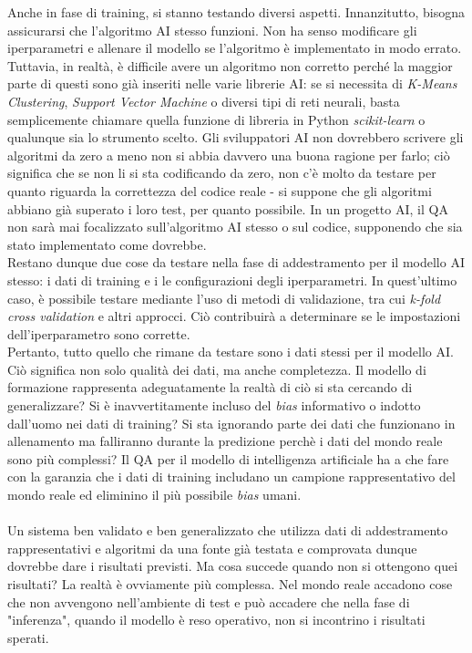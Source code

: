 \documentclass[a4paper,12pt]{report}
\begin{document}
Anche in fase di training, si stanno testando diversi aspetti. Innanzitutto, bisogna assicurarsi che l'algoritmo AI stesso funzioni. Non ha senso modificare gli iperparametri e allenare il modello se l'algoritmo è implementato in modo errato. Tuttavia, in realtà, è difficile avere un algoritmo non corretto perché la maggior parte di questi sono già inseriti nelle varie librerie AI: se si necessita di \textit{K-Means Clustering}, \textit{Support Vector Machine} o diversi tipi di reti neurali, basta semplicemente chiamare quella funzione di libreria in Python \textit{scikit-learn} o qualunque sia lo strumento scelto. Gli sviluppatori AI non dovrebbero scrivere gli algoritmi da zero a meno non si abbia davvero una buona ragione per farlo; ciò significa che se non li si sta codificando da zero, non c'è molto da testare per quanto riguarda la correttezza del codice reale - si suppone che gli algoritmi abbiano già superato i loro test, per quanto possibile. In un progetto AI, il QA non sarà mai focalizzato sull'algoritmo AI stesso o sul codice, supponendo che sia stato implementato come dovrebbe.\\
Restano dunque due cose da testare nella fase di addestramento per il modello AI stesso: i dati di training e i le configurazioni degli iperparametri. In quest'ultimo caso, è possibile testare mediante l'uso di metodi di validazione, tra cui \textit{k-fold cross validation} e altri approcci. Ciò contribuirà a determinare se le impostazioni dell'iperparametro sono corrette.\\
Pertanto, tutto quello che rimane da testare sono i dati stessi per il modello AI. Ciò significa non solo qualità dei dati, ma anche completezza. Il modello di formazione rappresenta adeguatamente la realtà di ciò si sta cercando di generalizzare? Si è inavvertitamente incluso del \textit{bias} informativo o indotto dall'uomo nei dati di training? Si sta ignorando parte dei dati che funzionano in allenamento ma falliranno durante la predizione perchè i dati del mondo reale sono più complessi? Il QA per il modello di intelligenza artificiale ha a che fare con la garanzia che i dati di training includano un campione rappresentativo del mondo reale ed eliminino il più possibile \textit{bias} umani.\\~\\
Un sistema ben validato e ben generalizzato che utilizza dati di addestramento rappresentativi e algoritmi da una fonte già testata e comprovata dunque dovrebbe dare i risultati previsti. Ma cosa succede quando non si ottengono quei risultati? La realtà è ovviamente più complessa. Nel mondo reale accadono cose che non avvengono nell'ambiente di test e può accadere che nella fase di "inferenza", quando il modello è reso operativo, non si incontrino i risultati sperati.\\
\end{document}
